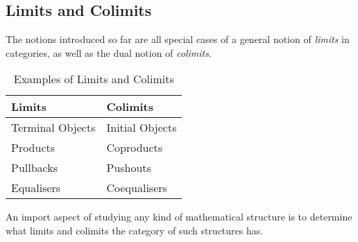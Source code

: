 \documentclass[]{amsbook}
\newcommand{\0}{\mathbf{0}}
\newcommand{\1}{\mathbf{1}}
\begin{document}
\subsection*{Limits and Colimits}
The notions introduced so far are all special cases of a general notion of
\emph{limits} in categories, as well as the dual notion of \emph{colimits}.
\begin{table}[h!]
\centering
\begin{tabular}{| l | l |}
    \hline
    \textbf{Limits} & \textbf{Colimits} \\
    \hline \hline
    Terminal Objects & Initial Objects \\
    Products & Coproducts \\
    Pullbacks & Pushouts \\
    Equalisers & Coequalisers \\
    \hline
\end{tabular}
\caption{Examples of Limits and Colimits}
\label{table: 1}
\end{table}
An import aspect of studying any kind of mathematical structure is to
determine what limits and colimits the category of such structures has.
\end{document}
